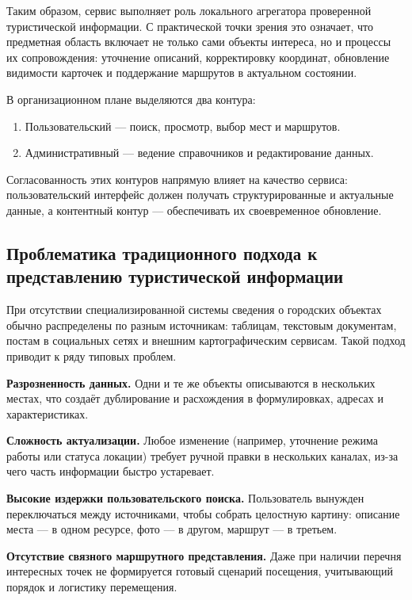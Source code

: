 Таким образом, сервис выполняет роль локального агрегатора проверенной туристической информации. С практической точки зрения это означает, что предметная область включает не только сами объекты интереса, но и процессы их сопровождения: уточнение описаний, корректировку координат, обновление видимости карточек и поддержание маршрутов в актуальном состоянии.

В организационном плане выделяются два контура:
\begin{enumerate}
	\item Пользовательский --- поиск, просмотр, выбор мест и маршрутов.
	\item Административный --- ведение справочников и редактирование данных.
\end{enumerate}

Согласованность этих контуров напрямую влияет на качество сервиса: пользовательский интерфейс должен получать структурированные и актуальные данные, а контентный контур --- обеспечивать их своевременное обновление.

\subsection{Проблематика традиционного подхода к представлению туристической информации}

При отсутствии специализированной системы сведения о городских объектах обычно распределены по разным источникам: таблицам, текстовым документам, постам в социальных сетях и внешним картографическим сервисам. Такой подход приводит к ряду типовых проблем.

\textbf{Разрозненность данных.} Одни и те же объекты описываются в нескольких местах, что создаёт дублирование и расхождения в формулировках, адресах и характеристиках.

\textbf{Сложность актуализации.} Любое изменение (например, уточнение режима работы или статуса локации) требует ручной правки в нескольких каналах, из-за чего часть информации быстро устаревает.

\textbf{Высокие издержки пользовательского поиска.} Пользователь вынужден переключаться между источниками, чтобы собрать целостную картину: описание места --- в одном ресурсе, фото --- в другом, маршрут --- в третьем.

\textbf{Отсутствие связного маршрутного представления.} Даже при наличии перечня интересных точек не формируется готовый сценарий посещения, учитывающий порядок и логистику перемещения.

